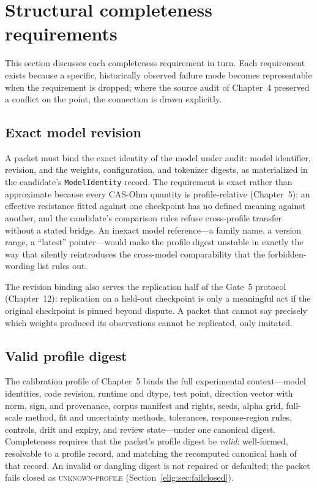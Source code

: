 \section{Structural completeness requirements}\label{elig:sec:completeness}

This section discusses each completeness requirement in turn. Each requirement exists because a specific, historically observed failure mode becomes representable when the requirement is dropped; where the source audit of Chapter~4 preserved a conflict on the point, the connection is drawn explicitly.

\subsection{Exact model revision}\label{elig:sec:modelrev}

A packet must bind the exact identity of the model under audit: model identifier, revision, and the weights, configuration, and tokenizer digests, as materialized in the candidate's \texttt{ModelIdentity} record. The requirement is exact rather than approximate because every CAS-Ohm quantity is profile-relative (Chapter~5): an effective resistance fitted against one checkpoint has no defined meaning against another, and the candidate's comparison rules refuse cross-profile transfer without a stated bridge. An inexact model reference---a family name, a version range, a ``latest'' pointer---would make the profile digest unstable in exactly the way that silently reintroduces the cross-model comparability that the forbidden-wording list rules out.

The revision binding also serves the replication half of the Gate~5 protocol (Chapter~12): replication on a held-out checkpoint is only a meaningful act if the original checkpoint is pinned beyond dispute. A packet that cannot say precisely which weights produced its observations cannot be replicated, only imitated.

\subsection{Valid profile digest}\label{elig:sec:profiledigest}

The calibration profile of Chapter~5 binds the full experimental context---model identities, code revision, runtime and dtype, test point, direction vector with norm, sign, and provenance, corpus manifest and rights, seeds, alpha grid, full-scale method, fit and uncertainty methods, tolerances, response-region rules, controls, drift and expiry, and review state---under one canonical digest. Completeness requires that the packet's profile digest be \emph{valid}: well-formed, resolvable to a profile record, and matching the recomputed canonical hash of that record. An invalid or dangling digest is not repaired or defaulted; the packet fails closed as \textsc{unknown-profile} (Section~\ref{elig:sec:failclosed}).

